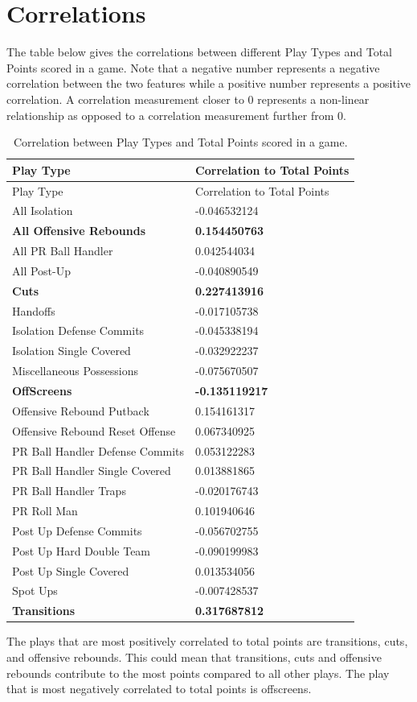 \documentclass[]{book}
\begin{document}
\pagebreak

\hypertarget{correlations}{%
\section{Correlations}\label{correlations}}

The table below gives the correlations between different Play Types and Total Points scored in a game. Note that a negative number represents a negative correlation between the two features while a positive number represents a positive correlation. A correlation measurement closer to 0 represents a non-linear relationship as opposed to a correlation measurement further from 0.

\begin{longtable}[]{@{}ll@{}}
\caption{\label{tab:corr-pts} Correlation between Play Types and Total Points scored in a game.}\tabularnewline
\toprule
Play Type & Correlation to Total Points\tabularnewline
\midrule
\endfirsthead
\toprule
Play Type & Correlation to Total Points\tabularnewline
\midrule
\endhead
All Isolation & -0.046532124\tabularnewline
\textbf{All Offensive Rebounds} & \textbf{0.154450763}\tabularnewline
All PR Ball Handler & 0.042544034\tabularnewline
All Post-Up & -0.040890549\tabularnewline
\textbf{Cuts} & \textbf{0.227413916}\tabularnewline
Handoffs & -0.017105738\tabularnewline
Isolation Defense Commits & -0.045338194\tabularnewline
Isolation Single Covered & -0.032922237\tabularnewline
Miscellaneous Possessions & -0.075670507\tabularnewline
\textbf{OffScreens} & \textbf{-0.135119217}\tabularnewline
Offensive Rebound Putback & 0.154161317\tabularnewline
Offensive Rebound Reset Offense & 0.067340925\tabularnewline
PR Ball Handler Defense Commits & 0.053122283\tabularnewline
PR Ball Handler Single Covered & 0.013881865\tabularnewline
PR Ball Handler Traps & -0.020176743\tabularnewline
PR Roll Man & 0.101940646\tabularnewline
Post Up Defense Commits & -0.056702755\tabularnewline
Post Up Hard Double Team & -0.090199983\tabularnewline
Post Up Single Covered & 0.013534056\tabularnewline
Spot Ups & -0.007428537\tabularnewline
\textbf{Transitions} & \textbf{0.317687812}\tabularnewline
\bottomrule
\end{longtable}

The plays that are most positively correlated to total points are transitions, cuts, and offensive rebounds. This could mean that transitions, cuts and offensive rebounds contribute to the most points compared to all other plays. The play that is most negatively correlated to total points is offscreens.
\end{document}
